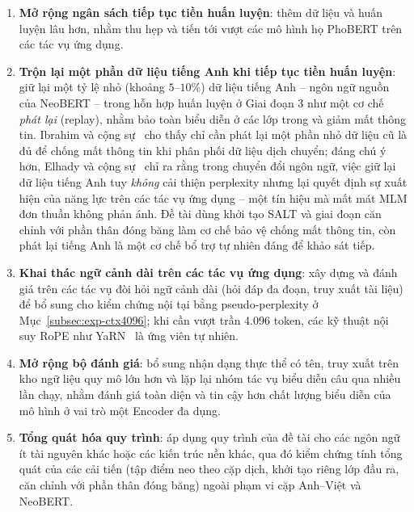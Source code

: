 \begin{enumerate}
  \item \textbf{Mở rộng ngân sách tiếp tục tiền huấn luyện}: thêm dữ liệu và
        huấn luyện lâu hơn, nhằm thu hẹp và tiến tới vượt
        các mô hình họ PhoBERT trên các tác vụ ứng dụng.
  \item \textbf{Trộn lại một phần dữ liệu tiếng Anh khi tiếp tục tiền huấn luyện}: giữ
        lại một tỷ lệ nhỏ (khoảng $5$--$10\%$) dữ liệu tiếng Anh -- ngôn ngữ nguồn của
        NeoBERT -- trong hỗn hợp huấn luyện ở Giai đoạn 3 như một cơ chế \textit{phát
        lại} (replay), nhằm bảo toàn biểu diễn ở các lớp trong và giảm mất thông tin. Ibrahim và cộng sự~\cite{ibrahim2024continual} cho thấy chỉ cần phát lại
        một phần nhỏ dữ liệu cũ là đủ để chống mất thông tin khi phân phối dữ liệu dịch chuyển;
        đáng chú ý hơn, Elhady và cộng sự~\cite{elhady2025emergent} chỉ ra rằng trong
        chuyển đổi ngôn ngữ, việc giữ lại dữ liệu tiếng Anh tuy \textit{không} cải thiện
        perplexity nhưng lại quyết định sự xuất hiện của năng lực trên các tác vụ ứng dụng -- một tín hiệu
        mà mất mát MLM đơn thuần không phản ánh. Đề tài dùng khởi tạo SALT và giai đoạn
        căn chỉnh với phần thân đóng băng làm cơ chế bảo vệ chống mất thông tin, còn phát lại tiếng Anh là một
        cơ chế bổ trợ tự nhiên đáng để khảo sát tiếp.
  \item \textbf{Khai thác ngữ cảnh dài trên các tác vụ ứng dụng}: xây dựng và đánh giá trên các tác
        vụ đòi hỏi ngữ cảnh dài (hỏi đáp đa đoạn, truy xuất tài liệu) để bổ sung cho
        kiểm chứng nội tại bằng pseudo-perplexity ở Mục~\ref{subsec:exp-ctx4096}; khi
        cần vượt trần 4.096 token, các kỹ thuật nội suy RoPE như
        YaRN~\cite{peng2023yarn} là ứng viên tự nhiên.
  \item \textbf{Mở rộng bộ đánh giá}: bổ sung nhận dạng thực thể có tên, truy xuất
        trên kho ngữ liệu quy mô lớn hơn và lặp lại nhóm tác vụ biểu diễn câu qua
        nhiều lần chạy, nhằm đánh giá toàn diện và tin cậy hơn chất lượng biểu diễn
        của mô hình ở vai trò một Encoder đa dụng.
  \item \textbf{Tổng quát hóa quy trình}: áp dụng quy trình của đề tài
        cho các ngôn ngữ ít tài nguyên khác hoặc các kiến trúc nền khác, qua đó kiểm
        chứng tính tổng quát của các cải tiến (tập điểm neo theo cặp dịch, khởi tạo riêng lớp
        đầu ra, căn chỉnh với phần thân đóng băng) ngoài phạm vi cặp Anh--Việt và NeoBERT.
\end{enumerate}
